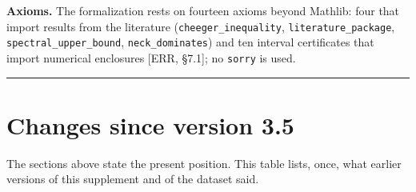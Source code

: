 \documentclass[11pt,a4paper]{article}
\begin{document}
\textbf{Axioms.} The formalization rests on fourteen axioms beyond Mathlib: four that import results from the literature (\texttt{cheeger\_\allowbreak{}inequality}, \texttt{literature\_\allowbreak{}package}, \texttt{spectral\_\allowbreak{}upper\_\allowbreak{}bound}, \texttt{neck\_\allowbreak{}dominates}) and ten interval certificates that import numerical enclosures {[}ERR, §7.1{]}; no \texttt{sorry} is used.

\begin{center}\rule{\linewidth}{0.5pt}\end{center}

\section{Changes since version 3.5}\label{changes-since-version-3.5}

The sections above state the present position. This table lists, once, what earlier versions of this supplement and of the dataset said.
\end{document}
